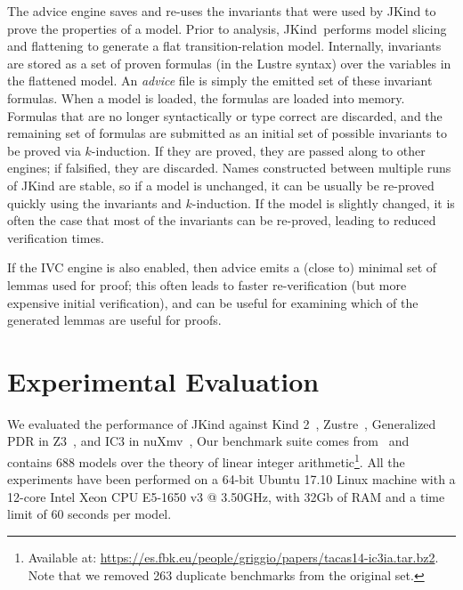 \documentclass{llncs}
\newcommand{\jkind}{{\sc JKind}\xspace}
\newcommand{\kind}{{\sc Kind}\xspace}
\newcommand{\lustre}{{\sc Lustre}\xspace}
\newcommand{\nuxmv}{{\sc nuXmv}\xspace}
\newcommand{\zustre}{{\sc Zustre}\xspace}
\newcommand{\zthree}{{\sc Z3}\xspace}
\renewcommand{\paragraph}[1]{\vspace{5pt}\noindent {\bf #1}}
\begin{document}
\paragraph{Advice.} The advice engine saves and re-uses the invariants that were used by \jkind to prove the properties of a model.  Prior to analysis, \jkind\ performs model slicing and flattening to generate a flat transition-relation model.  Internally, invariants are stored as a set of proven formulas (in the \lustre syntax) over the variables in the flattened model.  An {\em advice} file is simply the emitted set of these invariant formulas.  When a model is loaded, the formulas are loaded into memory. Formulas that are no longer syntactically or type correct are discarded, and the remaining set of formulas are submitted as an initial set of possible invariants to be proved via $k$-induction. If they are proved, they are passed along to other engines; if falsified, they are discarded.
%
Names constructed between multiple runs of \jkind are stable, so if a
model is unchanged, it can be usually be re-proved quickly using the
invariants and $k$-induction.  If the model is slightly changed, it is
often the case that most of the invariants can be re-proved, leading
to reduced verification times.

If the IVC engine is also enabled, then advice emits a (close to) minimal set of lemmas used for proof; this often leads to faster re-verification (but more expensive initial verification), and can be useful for examining which of the generated lemmas are useful for proofs.

\section{Experimental Evaluation}
\label{sec:experiment}
We evaluated the performance of \jkind against \kind
2~\cite{champion2016cav}, \zustre~\cite{Zustre}, Generalized PDR in
\zthree~\cite{GPDR}, and IC3 in \nuxmv~\cite{cimatti2014tacas}, Our
benchmark suite comes from~\cite{cimatti2014tacas} and contains 688
models over the theory of linear integer arithmetic\footnote{Available
  at:
  \url{https://es.fbk.eu/people/griggio/papers/tacas14-ic3ia.tar.bz2}.
  Note that we removed 263 duplicate benchmarks from the original
  set.}.  All the experiments have been performed on a 64-bit Ubuntu
17.10 Linux machine with a 12-core Intel Xeon CPU E5-1650 v3 @
3.50GHz, with 32Gb of RAM and a time limit of 60 seconds per model.
\end{document}

